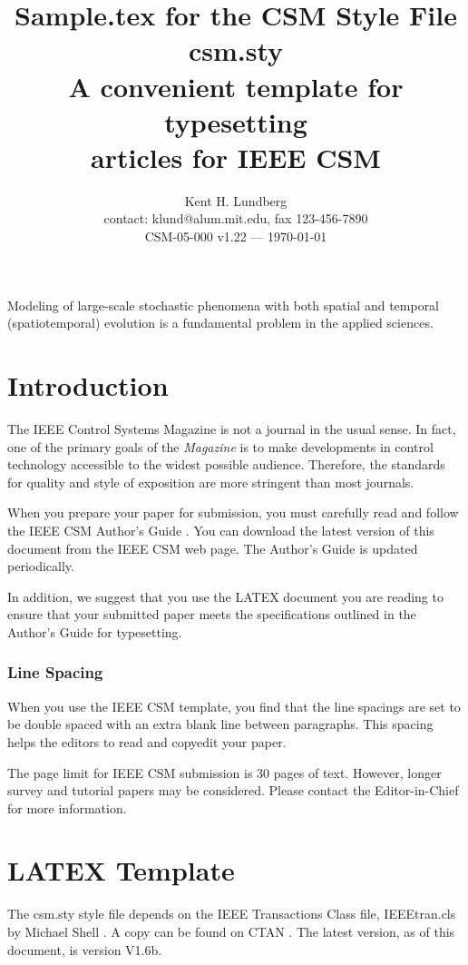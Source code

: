 \documentclass[letterpaper,12pt,peerreviewca,draftcls]{IEEEtran}
\title{Sample.tex for the CSM Style File csm.sty\\
A convenient template for typesetting\\
articles for IEEE CSM }
\author{Kent H. Lundberg \\
contact: klund@alum.mit.edu, fax 123-456-7890 \\
CSM-05-000 v1.22 --- \today}
\begin{document}
\maketitle
\CSMsetup

Modeling of large-scale stochastic phenomena with both spatial and temporal (spatiotemporal) evolution is a fundamental problem in the applied sciences.
\section{Introduction}

The IEEE Control Systems Magazine is not a journal in the usual sense.
In fact, one of the primary goals of the {\it Magazine} is to make
developments in control technology accessible to the widest possible
audience.  Therefore, the standards for quality and style of exposition
are more stringent than most journals.


When you prepare your paper for submission, you must carefully read and
follow the IEEE CSM Author's Guide \cite{CSMguide}.  You can download
the latest version of this document from the IEEE CSM web page.  The
Author's Guide is updated periodically.


In addition, we suggest that you use the LATEX document you are reading
to ensure that your submitted paper meets the specifications outlined in
the Author's Guide for typesetting.


\subsubsection{Line Spacing}


When you use the IEEE CSM template, you find that the line spacings are
set to be double spaced with an extra blank line between paragraphs.
This spacing helps the editors to read and copyedit your paper.


The page limit for IEEE CSM submission is 30 pages of text.  However,
longer survey and tutorial papers may be considered.  Please contact the
Editor-in-Chief for more information.


\section{LATEX Template}


The csm.sty style file depends on the IEEE Transactions Class file,
IEEEtran.cls by Michael Shell \cite{IEEEtran}.  A copy can be found on
CTAN \cite{ctan}.  The latest version, as of this document, is version
V1.6b.
\end{document}
